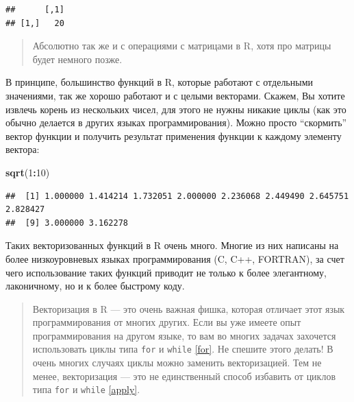\documentclass[]{book}
\newenvironment{Shaded}{\begin{snugshade}}{\end{snugshade}}
\newcommand{\KeywordTok}[1]{\textcolor[rgb]{0.13,0.29,0.53}{\textbf{#1}}}
\newcommand{\DecValTok}[1]{\textcolor[rgb]{0.00,0.00,0.81}{#1}}
\newcommand{\StringTok}[1]{\textcolor[rgb]{0.31,0.60,0.02}{#1}}
\newcommand{\OperatorTok}[1]{\textcolor[rgb]{0.81,0.36,0.00}{\textbf{#1}}}
\newcommand{\NormalTok}[1]{#1}
\begin{document}
\begin{Shaded}
\end{Shaded}

\begin{verbatim}
##      [,1]
## [1,]   20
\end{verbatim}

\begin{quote}
Абсолютно так же и с операциями с матрицами в R, хотя про матрицы будет
немного позже.
\end{quote}

В принципе, большинство функций в R, которые работают с отдельными
значениями, так же хорошо работают и с целыми векторами. Скажем, Вы
хотите извлечь корень из нескольких чисел, для этого не нужны никакие
циклы (как это обычно делается в других языках программирования). Можно
просто ``скормить'' вектор функции и получить результат применения
функции к каждому элементу вектора:

\begin{Shaded}
\begin{Highlighting}[]
\KeywordTok{sqrt}\NormalTok{(}\DecValTok{1}\OperatorTok{:}\DecValTok{10}\NormalTok{)}
\end{Highlighting}
\end{Shaded}

\begin{verbatim}
##  [1] 1.000000 1.414214 1.732051 2.000000 2.236068 2.449490 2.645751 2.828427
##  [9] 3.000000 3.162278
\end{verbatim}

Таких векторизованных функций в R очень много. Многие из них написаны на
более низкоуровневых языках программирования (C, C++, FORTRAN), за счет
чего использование таких функций приводит не только к более элегантному,
лаконичному, но и к более быстрому коду.

\begin{quote}
Векторизация в R --- это очень важная фишка, которая отличает этот язык
программирования от многих других. Если вы уже имеете опыт
программирования на другом языке, то вам во многих задачах захочется
использовать циклы типа \texttt{for} и \texttt{while} \ref{for}. Не
спешите этого делать! В очень многих случаях циклы можно заменить
векторизацией. Тем не менее, векторизация --- это не единственный способ
избавить от циклов типа \texttt{for} и \texttt{while} \ref{apply}.
\end{quote}
\end{document}
